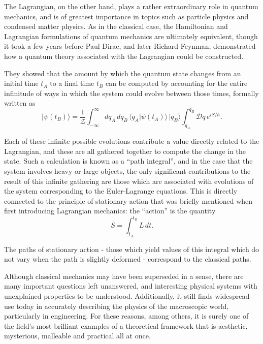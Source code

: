 \documentclass[11pt]{article}
\begin{document}
The Lagrangian, on the other hand, plays a rather extraordinary role in quantum mechanics, and is of greatest importance in topics such as particle physics and condensed matter physics. As in the classical case, the Hamiltonian and Lagrangian formulations of quantum mechanics are ultimately equivalent, though it took a few years before Paul Dirac, and later Richard Feynman, demonstrated how a quantum theory associated with the Lagrangian could be constructed.
\newpage

They showed that the amount by which the quantum state changes from an initial time $t_A$ to a final time $t_B$ can be computed by accounting for the entire infinitude of ways in which the system could evolve between those times, formally written as
$$\vert\psi(t_B)\rangle=\frac{1}{\mathcal{Z}}\int_{-\infty}^\infty dq_A\,dq_B\,\langle q_A\vert\psi(t_A)\rangle\,\vert q_B\rangle\int_{q_A}^{q_B}\mathcal{D}q\,e^{iS/\hbar}.$$

Each of these infinite possible evolutions contribute a value directly related to the Lagrangian, and these are all gathered together to compute the change in the state. Such a calculation is known as a ``path integral'', and in the case that the system involves heavy or large objects, the only significant contributions to the result of this infinite gathering are those which are associated with evolutions of the system corresponding to the Euler\hyp{}Lagrange equations. This is directly connected to the principle of stationary action that was briefly mentioned when first introducing Lagrangian mechanics: the ``action'' is the quantity
$$S=\int_{t_A}^{t_B}L\,dt.$$

The paths of stationary action \hyp{} those which yield values of this integral which do not vary when the path is slightly deformed \hyp{} correspond to the classical paths.
\newline

Although classical mechanics may have been superseded in a sense, there are many important questions left unanswered, and interesting physical systems with unexplained properties to be understood. Additionally, it still finds widespread use today in accurately describing the physics of the macroscopic world, particularly in engineering. For these reasons, among others, it is surely one of the field's most brilliant examples of a theoretical framework that is aesthetic, mysterious, malleable and practical all at once.
\end{document}
